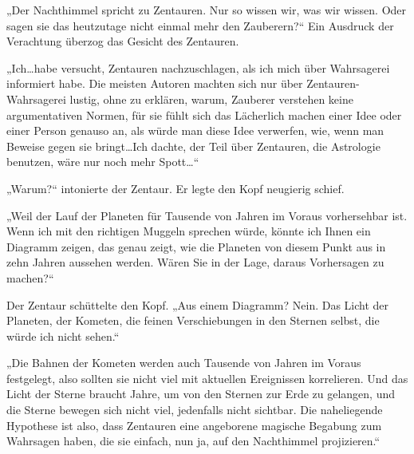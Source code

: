 „Der Nachthimmel spricht zu Zentauren. Nur so wissen wir, was wir wissen. Oder sagen sie das heutzutage nicht einmal mehr den Zauberern?“
Ein Ausdruck der Verachtung überzog das Gesicht des Zentauren.

„Ich…habe versucht, Zentauren nachzuschlagen, als ich mich über Wahrsagerei informiert habe. Die meisten Autoren machten sich nur über Zentauren-Wahrsagerei lustig, ohne zu erklären, warum, Zauberer verstehen keine argumentativen Normen, für sie fühlt sich das Lächerlich machen einer Idee oder einer Person genauso an, als würde man diese Idee verwerfen, wie, wenn man Beweise gegen sie bringt…Ich dachte, der Teil über Zentauren, die Astrologie benutzen, wäre nur noch mehr Spott…“

„Warum?“ intonierte der Zentaur. Er legte den Kopf neugierig schief.

„Weil der Lauf der Planeten für Tausende von Jahren im Voraus vorhersehbar ist. Wenn ich mit den richtigen Muggeln sprechen würde, könnte ich Ihnen ein Diagramm zeigen, das genau zeigt, wie die Planeten von diesem Punkt aus in zehn Jahren aussehen werden. Wären Sie in der Lage, daraus Vorhersagen zu machen?“

Der Zentaur schüttelte den Kopf.
„Aus einem Diagramm? Nein. Das Licht der Planeten, der Kometen, die feinen Verschiebungen in den Sternen selbst, die würde ich nicht sehen.“

„Die Bahnen der Kometen werden auch Tausende von Jahren im Voraus festgelegt, also sollten sie nicht viel mit aktuellen Ereignissen korrelieren. Und das Licht der Sterne braucht Jahre, um von den Sternen zur Erde zu gelangen, und die Sterne bewegen sich nicht viel, jedenfalls nicht sichtbar. Die naheliegende Hypothese ist also, dass Zentauren eine angeborene magische Begabung zum Wahrsagen haben, die sie einfach, nun ja, auf den Nachthimmel projizieren.“

